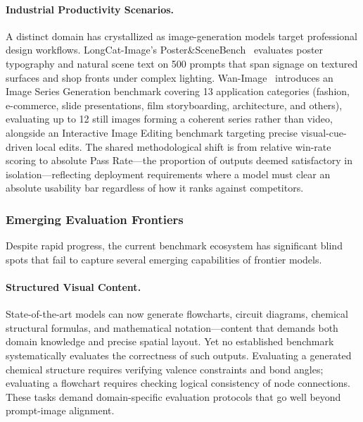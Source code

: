 \documentclass{llmxive}
\begin{document}
\paragraph{Industrial Productivity Scenarios.} A distinct domain has crystallized as image-generation models target professional design workflows. LongCat-Image's Poster\&SceneBench~\citep{team2025longcat} evaluates poster typography and natural scene text on 500 prompts that span signage on textured surfaces and shop fronts under complex lighting. Wan-Image~\citep{mao2026wan} introduces an Image Series Generation benchmark covering 13 application categories (fashion, e-commerce, slide presentations, film storyboarding, architecture, and others), evaluating up to 12 still images forming a coherent series rather than video, alongside an Interactive Image Editing benchmark targeting precise visual-cue-driven local edits. The shared methodological shift is from relative win-rate scoring to absolute Pass Rate---the proportion of outputs deemed satisfactory in isolation---reflecting deployment requirements where a model must clear an absolute usability bar regardless of how it ranks against competitors.


\subsubsection{Emerging Evaluation Frontiers}
\label{subsubsec:emerging_eval}

Despite rapid progress, the current benchmark ecosystem has significant blind spots that fail to capture several emerging capabilities of frontier models.

\paragraph{Structured Visual Content.} State-of-the-art models can now generate flowcharts, circuit diagrams, chemical structural formulas, and mathematical notation---content that demands both domain knowledge and precise spatial layout. Yet no established benchmark systematically evaluates the correctness of such outputs. Evaluating a generated chemical structure requires verifying valence constraints and bond angles; evaluating a flowchart requires checking logical consistency of node connections. These tasks demand domain-specific evaluation protocols that go well beyond prompt-image alignment.
\end{document}
